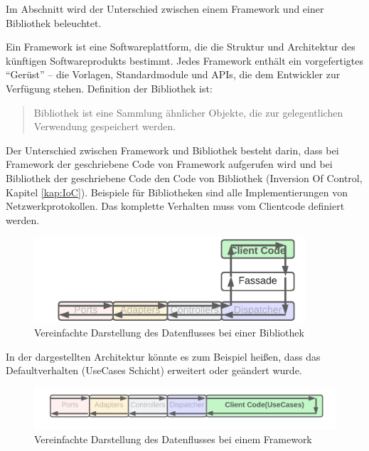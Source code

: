 Im Abschnitt wird der Unterschied zwischen einem Framework und einer Bibliothek beleuchtet.

Ein Framework ist eine Softwareplattform, die die Struktur und Architektur des künftigen Softwareprodukts bestimmt.
Jedes Framework enthält ein vorgefertigtes “Gerüst” – die Vorlagen, Standardmodule und APIs, 
die dem Entwickler zur Verfügung stehen.
\footnotemark
{}
Definition der Bibliothek ist:
\begin{quote}
    Bibliothek ist eine Sammlung ähnlicher Objekte, die zur gelegentlichen Verwendung gespeichert werden.\footnotemark
\end{quote}

Der Unterschied zwischen Framework und Bibliothek besteht darin, 
dass bei Framework der geschriebene Code von Framework aufgerufen wird 
und bei Bibliothek der geschriebene Code den Code von Bibliothek  (Inversion Of Control, Kapitel \ref{kap:IoC}).
\footnotemark
{}
Beispiele für Bibliotheken sind alle Implementierungen von Netzwerkprotokollen.
Das komplette Verhalten muss vom Clientcode definiert werden.

\begin{figure}[H]
    \centering
    \includegraphics[width=0.9\textwidth]{./images/Dataflow Library.png}
    \caption{Vereinfachte Darstellung des Datenflusses bei einer Bibliothek}
    \label{fig:SimpliedDataflowLibrary}
\end{figure}

In der dargestellten Architektur könnte es zum Beispiel heißen, 
dass das Defaultverhalten (UseCases Schicht) erweitert oder geändert wurde.

\begin{figure}[H]
    \centering
    \includegraphics[width=1\textwidth]{./images/Dataflow Framework.png}
    \caption{Vereinfachte Darstellung des Datenflusses bei einem Framework}
    \label{fig:SimpliedDataflowFramework}
\end{figure}

